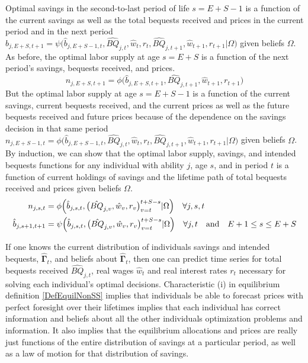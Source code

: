 \documentclass[letterpaper,12pt]{article}
\theoremstyle{definition}
\begin{document}
  Optimal savings in the second-to-last period of life $s=E+S-1$ is a function of the current savings as well as the total bequests received and prices in the current period and in the next period $\hat{b}_{j,E+S,t+1} = \psi\bigl(\hat{b}_{j,E+S-1,t},\hat{BQ}_{j,t},\hat{w}_t,r_t,\hat{BQ}_{j,t+1},\hat{w}_{t+1},r_{t+1}|\Omega\bigr)$ given beliefs $\Omega$. As before, the optimal labor supply at age $s=E+S$ is a function of the next period's savings, bequests received, and prices.
  \begin{equation*}
    n_{j,E+S,t+1}=\phi\bigl(\hat{b}_{j,E+S,t+1},\hat{BQ}_{j,t+1},\hat{w}_{t+1},r_{t+1}\bigr)
  \end{equation*}
  But the optimal labor supply at age $s=E+S-1$ is a function of the current savings, current bequests received, and the current prices as well as the future bequests received and future prices because of the dependence on the savings decision in that same period $n_{j,E+S-1,t}=\phi\bigl(\hat{b}_{j,E+S-1,t},\hat{BQ}_{j,t},\hat{w}_t,r_t,\hat{BQ}_{j,t+1},\hat{w}_{t+1},r_{t+1}|\Omega\bigr)$ given beliefs $\Omega$. By induction, we can show that the optimal labor supply, savings, and intended bequests functions for any individual with ability $j$, age $s$, and in period $t$ is a function of current holdings of savings and the lifetime path of total bequests received and prices given beliefs $\Omega$.
  \begin{align}
    n_{j,s,t} &= \phi\Bigl(\hat{b}_{j,s,t},\bigl(\hat{BQ}_{j,v},\hat{w}_v,r_v\bigr)_{v=t}^{t+S-s}|\Omega\Bigr) \quad\forall j,s,t \label{EqLabPolFuncGen} \\
    \hat{b}_{j,s+1,t+1} &= \psi\Bigl(\hat{b}_{j,s,t},\bigl(\hat{BQ}_{j,v},\hat{w}_v,r_v\bigr)_{v=t}^{t+S-s}|\Omega\Bigr) \quad\forall j,t \quad\text{and}\quad E+1\leq s\leq E+S \label{EqSavPolFuncGen}
  \end{align}

  If one knows the current distribution of individuals savings and intended bequests, $\bm{\hat{\Gamma}}_t$, and beliefs about $\bm{\hat{\Gamma}}_t$, then one can predict time series for total bequests received $\hat{BQ}_{j,t}$, real wages $\hat{w}_t$ and real interest rates $r_t$ necessary for solving each individual's optimal decisions. Characteristic (i) in equilibrium definition \ref{DefEquilNonSS} implies that individuals be able to forecast prices with perfect foresight over their lifetimes implies that each individual has correct information and beliefs about all the other individuals optimization problems and information. It also implies that the equilibrium allocations and prices are really just functions of the entire distribution of savings at a particular period, as well as a law of motion for that distribution of savings.
\end{document}
